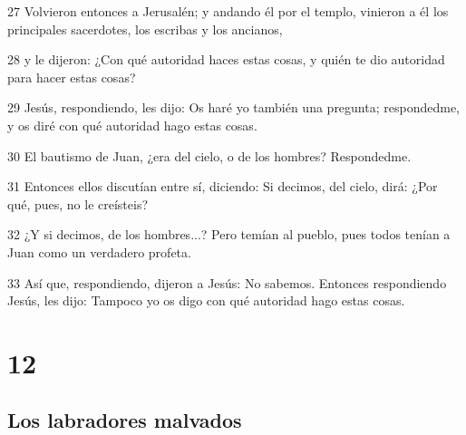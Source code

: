 \par 27 Volvieron entonces a Jerusalén; y andando él por el templo, vinieron a él los principales sacerdotes, los escribas y los ancianos,
\par 28 y le dijeron: ¿Con qué autoridad haces estas cosas, y quién te dio autoridad para hacer estas cosas?
\par 29 Jesús, respondiendo, les dijo: Os haré yo también una pregunta; respondedme, y os diré con qué autoridad hago estas cosas.
\par 30 El bautismo de Juan, ¿era del cielo, o de los hombres? Respondedme.
\par 31 Entonces ellos discutían entre sí, diciendo: Si decimos, del cielo, dirá: ¿Por qué, pues, no le creísteis?
\par 32 ¿Y si decimos, de los hombres...? Pero temían al pueblo, pues todos tenían a Juan como un verdadero profeta.
\par 33 Así que, respondiendo, dijeron a Jesús: No sabemos. Entonces respondiendo Jesús, les dijo: Tampoco yo os digo con qué autoridad hago estas cosas.

\chapter{12}

\section*{Los labradores malvados}

